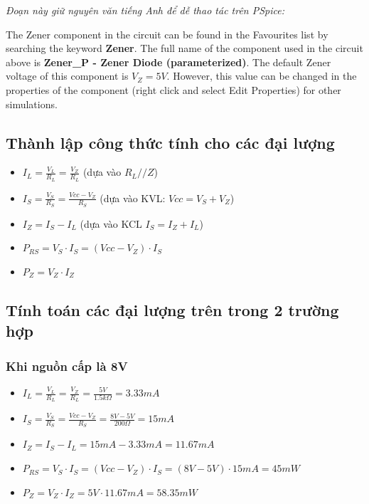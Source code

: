 \textit{Đoạn này giữ nguyên văn tiếng Anh để dễ thao tác trên PSpice:}

The Zener component in the circuit can be found in the Favourites list by searching the keyword \textbf{Zener}. The full name of the component used in the circuit above is \textbf{Zener\_P - Zener Diode (parameterized)}. The default Zener voltage of this component is $V_{Z} = 5V$. However, this value can be changed in the properties of the component (right click and select Edit Properties) for other simulations.
\subsection{Thành lập công thức tính cho các đại lượng}
\begin{itemize}
    \item \(I_{L} = \frac{V_{L}}{R_{L}} = \frac{V_{Z}}{R_{L}}\) (dựa vào $R_{L} // Z$)
    \item \(I_{S} = \frac{V_{S}}{R_{S}} = \frac{Vcc - V_{Z}}{R_{S}}\) (dựa vào KVL: $Vcc = V_{S} + V_{Z}$) 
    \item \(I_{Z} = I_{S} - I_{L}\) (dựa vào KCL $I_{S} = I_{Z} + I_{L}$)
    \item \(P_{RS} = V_{S} \cdot I_{S} = (Vcc - V_{Z}) \cdot I_{S}\)
    \item \(P_{Z} = V_{Z} \cdot I_{Z}\)
\end{itemize}

\subsection{Tính toán các đại lượng trên trong 2 trường hợp}
\subsubsection{Khi nguồn cấp là 8V}
\begin{itemize}
    \item \(I_{L} = \frac{V_{L}}{R_{L}} = \frac{V_{Z}}{R_{L}} =\frac{5V}{1.5k\Omega} = 3.33mA\)
    \item \(I_{S} = \frac{V_{S}}{R_{S}} = \frac{Vcc - V_{Z}}{R_{S}} = \frac{8V - 5V}{200\Omega} = 15mA\)  
    \item \(I_{Z} = I_{S} - I_{L} = 15mA - 3.33mA = 11.67mA\) 
    \item \(P_{RS} = V_{S} \cdot I_{S} = (Vcc - V_{Z}) \cdot I_{S} = (8V - 5V) \cdot 15mA = 45mW\)
    \item \(P_{Z} = V_{Z} \cdot I_{Z} = 5V \cdot 11.67mA = 58.35mW\)
\end{itemize}
